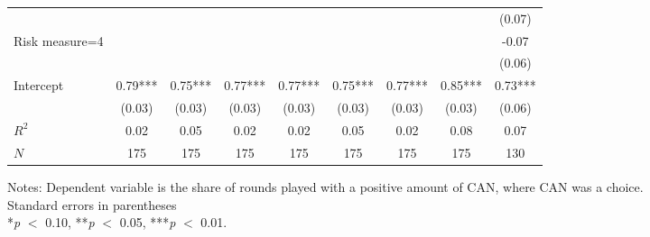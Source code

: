 \begin{table}[htbp]
\begin{threeparttable}
\begin{tabular}{l cccccccc}
                    &               &               &               &               &               &               &               &      (0.07)   \\
Risk measure=4      &               &               &               &               &               &               &               &       -0.07   \\
                    &               &               &               &               &               &               &               &      (0.06)   \\
Intercept           &        0.79***&        0.75***&        0.77***&        0.77***&        0.75***&        0.77***&        0.85***&        0.73***\\
                    &      (0.03)   &      (0.03)   &      (0.03)   &      (0.03)   &      (0.03)   &      (0.03)   &      (0.03)   &      (0.06)   \\
\hline
$R^2$               &        0.02   &        0.05   &        0.02   &        0.02   &        0.05   &        0.02   &        0.08   &        0.07   \\
$N$                 &         175   &         175   &         175   &         175   &         175   &         175   &         175   &         130   \\
\hline
\hline
\end{tabular}
\begin{tablenotes}
\footnotesize
\item{Notes: Dependent variable is the share of rounds played with a positive amount of CAN, where CAN was a choice. \\ Standard errors in parentheses \\ *\textit{p} $<$ 0.10, **\textit{p} $<$ 0.05, ***\textit{p} $<$ 0.01.}
\end{tablenotes}
\end{threeparttable}
\end{table}
